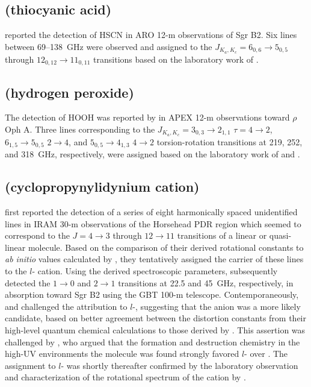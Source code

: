 \documentclass[twocolumn]{aastex631}
\begin{document}
    \subsection{ (thiocyanic acid)}
	\label{HSCN}
	
	\citet{Halfen:2009it} reported the detection of HSCN in ARO 12-m observations of Sgr B2.  Six lines between 69--138~GHz were observed and assigned to the $J_{K_a,K_c} = 6_{0,6}\rightarrow5_{0,5}$ through $12_{0,12}\rightarrow11_{0,11}$ transitions based on the laboratory work of \citet{Brunken:2009fh}.
	
	\subsection{ (hydrogen peroxide)}
	\label{HOOH}
	
	The detection of HOOH was reported by \citet{Bergman:2011dy} in APEX 12-m observations toward $\rho$ Oph A.  Three lines corresponding to the $J_{K_a,K_c} = 3_{0,3}\rightarrow2_{1,1}$ $\tau = 4\rightarrow2$, $6_{1,5}\rightarrow5_{0,5}$ $2\rightarrow4$, and $5_{0,5}\rightarrow4_{1,3}$ $4\rightarrow2$ torsion-rotation transitions at 219, 252, and 318~GHz, respectively, were assigned based on the laboratory work of \citet{Helminger:1981nd} and \citet{Petkie:1995dc}.
	
	\subsection{ (cyclopropynylidynium cation)}
	\label{l-C3H+}
	
	\citet{Pety:2012cp} first reported the detection of a series of eight harmonically spaced unidentified lines in IRAM 30-m observations of the Horsehead PDR region which seemed to correspond to the $J = 4\rightarrow3$ through $12\rightarrow11$ transitions of a linear or quasi-linear molecule.  Based on the comparison of their derived rotational constants to \emph{ab initio} values calculated by \citet{Ikuta:1997it}, they tentatively assigned the carrier of these lines to the $l$- cation.  Using the derived spectroscopic parameters, \citet{McGuire:2013hc} subsequently detected the $1\rightarrow0$ and $2\rightarrow1$ transitions at 22.5 and 45~GHz, respectively, in absorption toward Sgr B2 using the GBT 100-m telescope.  Contemporaneously, \citet{Huang:2013fo} and \citet{Fortenberry:2013ew} challenged the attribution to $l$-, suggesting that the  anion was a more likely candidate, based on better agreement between the distortion constants from their high-level quantum chemical calculations to those derived by \citet{Pety:2012cp}.  This assertion was challenged by \citet{McGuire:2014gt}, who argued that the formation and destruction chemistry in the high-UV environments the molecule was found strongly favored $l$- over .  The assignment to $l$- was shortly thereafter confirmed by the laboratory observation and characterization of the rotational spectrum of the cation by \citet{Brunken:2014cf}.
	
\end{document}
